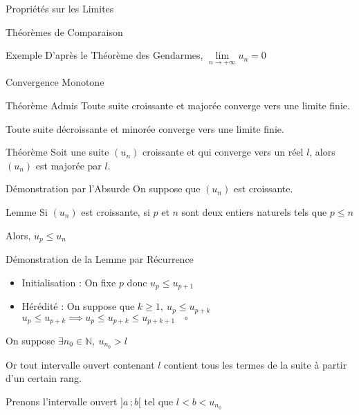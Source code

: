 \documentclass{cours}
\begin{document}
\begin{Gpartie}{Propriétés sur les Limites}
\begin{Spartie}{Théorèmes de Comparaison}
\begin{SSpartie}{Exemple}
                D'après le Théorème des Gendarmes, $\lim\limits_{n\to +\infty}u_n=0$
            \end{SSpartie}
        \end{Spartie}
        \pagebreak
        \begin{Spartie}{Convergence Monotone} 
            \begin{SSpartie}{Théorème Admis} 
                Toute suite croissante et majorée converge vers une limite finie.

                Toute suite décroissante et minorée converge vers une limite finie.
            \end{SSpartie}
            \begin{SSpartie}{Théorème} 
                Soit une suite $(u_n)$ croissante et qui converge vers un réel $l$, alors $(u_n)$ est majorée par $l$.
                \begin{SSSpartie}{Démonstration par l'Absurde} 
                    On suppose que $(u_n)$ est croissante.
                    \begin{SSSSpartie}{Lemme} 
                        Si $(u_n)$ est croissante, si $p$ et $n$ sont deux entiers naturels tels que $p\leq n$

                        Alors, $u_p\leq u_n$
                    \end{SSSSpartie}
                    \begin{SSSSpartie}{Démonstration de la Lemme par Récurrence}
                        \vspace{-1em}
                        \begin{itemize}
                            \item Initialisation : On fixe $p$ donc $u_p\leq u_{p+1}$
                            \item Hérédité : On suppose que $k\geq 1,\ u_p\leq u_{p+k}$ \\
                            \phantom{Hérédité : }$u_p\leq u_{p+k}\implies u_p\leq u_{p+k}\leq u_{p+k+1}\quad\square$
                        \end{itemize}   
                    \end{SSSSpartie}
                    On suppose $\exists n_0\in\mathbb{N},\ u_{n_0}>l$

                    Or tout intervalle ouvert contenant $l$ contient tous les termes de la suite à partir d'un certain rang.

                    Prenons l'intervalle ouvert $\big]a\,;b\big[$ tel que $l<b<u_{n_0}$


\end{SSSpartie}
\end{SSpartie}
\end{Spartie}
\end{Gpartie}
\end{document}
